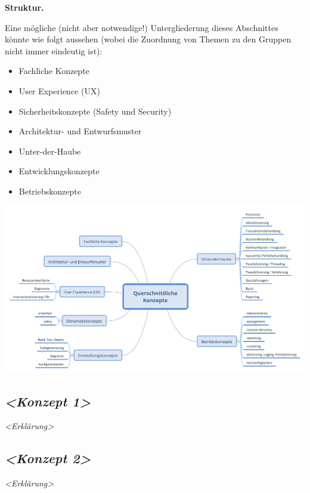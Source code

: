 \documentclass[]{article}
\begin{document}
\textbf{Struktur.}

Eine mögliche (nicht aber notwendige!) Untergliederung dieses
Abschnittes könnte wie folgt aussehen (wobei die Zuordnung von Themen zu
den Gruppen nicht immer eindeutig ist):

\begin{itemize}
\item
  Fachliche Konzepte
\item
  User Experience (UX)
\item
  Sicherheitskonzepte (Safety und Security)
\item
  Architektur- und Entwurfsmuster
\item
  Unter-der-Haube
\item
  Entwicklungskonzepte
\item
  Betriebskonzepte
\end{itemize}

\includegraphics{images/08-Crosscutting-Concepts-Structure-DE.png}

\subsection{\texorpdfstring{\emph{\textless{}Konzept
1\textgreater{}}}{\textless{}Konzept 1\textgreater{}}}\label{__emphasis_konzept_1_emphasis}

\emph{\textless{}Erklärung\textgreater{}}

\subsection{\texorpdfstring{\emph{\textless{}Konzept
2\textgreater{}}}{\textless{}Konzept 2\textgreater{}}}\label{__emphasis_konzept_2_emphasis}

\emph{\textless{}Erklärung\textgreater{}}
\end{document}

